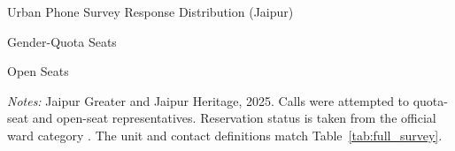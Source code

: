 \begin{table}[!htbp]
    \centering
    \caption{Urban Phone Survey Response Distribution (Jaipur)}
    \label{tab:urban_survey}
    \begin{subtable}[t]{0.47\linewidth}
        \centering
        \caption{Gender-Quota Seats}
        \label{tab:jaipur_quota}
        
    \end{subtable}
    \hfill
    \begin{subtable}[t]{0.47\linewidth}
        \centering
        \caption{Open Seats}
        \label{tab:jaipur_open}
        
    \end{subtable}
    \vspace{0.5ex}
    \parbox{0.9\textwidth}{\scriptsize
        \emph{Notes:} Jaipur Greater and Jaipur Heritage, 2025. Calls were attempted to \jaipurQuotaSampled{} quota-seat and \jaipurOpenSampled{} open-seat representatives. Reservation status is taken from the official ward category \citep[pp.~43--53]{secrajasthan2020municipal}. The unit and contact definitions match Table~\ref{tab:full_survey}.
    }
\end{table}
\FloatBarrier
